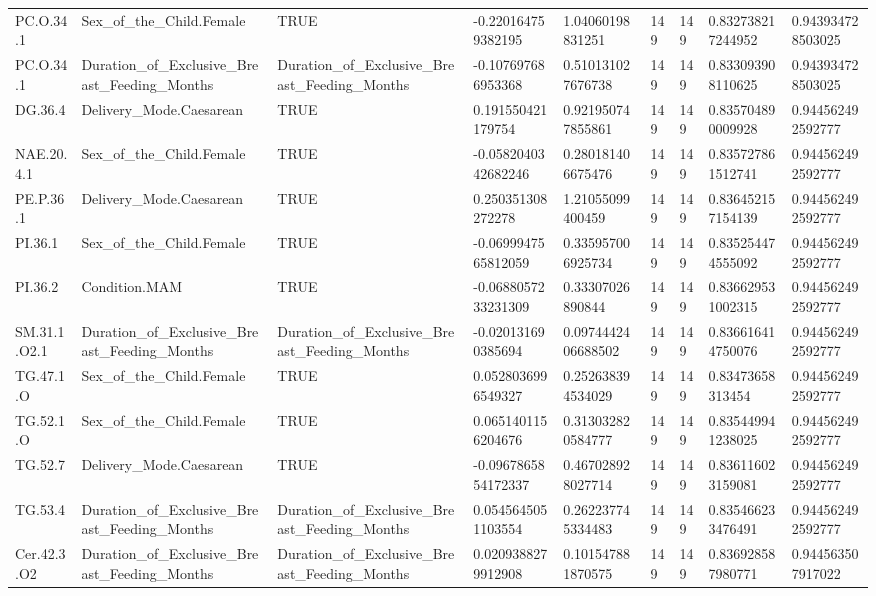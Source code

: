 \begin{longtable}{lllllllll}
PC.O.34.1 & Sex\_of\_the\_Child.Female & TRUE & -0.220164759382195 & 1.04060198831251 & 149 & 149 & 0.832738217244952 & 0.943934728503025 \\
PC.O.34.1 & Duration\_of\_Exclusive\_Breast\_Feeding\_Months & Duration\_of\_Exclusive\_Breast\_Feeding\_Months & -0.107697686953368 & 0.510131027676738 & 149 & 149 & 0.833093908110625 & 0.943934728503025 \\
DG.36.4 & Delivery\_Mode.Caesarean & TRUE & 0.191550421179754 & 0.921950747855861 & 149 & 149 & 0.835704890009928 & 0.944562492592777 \\
NAE.20.4.1 & Sex\_of\_the\_Child.Female & TRUE & -0.0582040342682246 & 0.280181406675476 & 149 & 149 & 0.835727861512741 & 0.944562492592777 \\
PE.P.36.1 & Delivery\_Mode.Caesarean & TRUE & 0.250351308272278 & 1.21055099400459 & 149 & 149 & 0.836452157154139 & 0.944562492592777 \\
PI.36.1 & Sex\_of\_the\_Child.Female & TRUE & -0.0699947565812059 & 0.335957006925734 & 149 & 149 & 0.835254474555092 & 0.944562492592777 \\
PI.36.2 & Condition.MAM & TRUE & -0.0688057233231309 & 0.33307026890844 & 149 & 149 & 0.836629531002315 & 0.944562492592777 \\
SM.31.1.O2.1 & Duration\_of\_Exclusive\_Breast\_Feeding\_Months & Duration\_of\_Exclusive\_Breast\_Feeding\_Months & -0.020131690385694 & 0.0974442406688502 & 149 & 149 & 0.836616414750076 & 0.944562492592777 \\
TG.47.1.O & Sex\_of\_the\_Child.Female & TRUE & 0.0528036996549327 & 0.252638394534029 & 149 & 149 & 0.83473658313454 & 0.944562492592777 \\
TG.52.1.O & Sex\_of\_the\_Child.Female & TRUE & 0.0651401156204676 & 0.313032820584777 & 149 & 149 & 0.835449941238025 & 0.944562492592777 \\
TG.52.7 & Delivery\_Mode.Caesarean & TRUE & -0.0967865854172337 & 0.467028928027714 & 149 & 149 & 0.836116023159081 & 0.944562492592777 \\
TG.53.4 & Duration\_of\_Exclusive\_Breast\_Feeding\_Months & Duration\_of\_Exclusive\_Breast\_Feeding\_Months & 0.0545645051103554 & 0.262237745334483 & 149 & 149 & 0.835466233476491 & 0.944562492592777 \\
Cer.42.3.O2 & Duration\_of\_Exclusive\_Breast\_Feeding\_Months & Duration\_of\_Exclusive\_Breast\_Feeding\_Months & 0.0209388279912908 & 0.101547881870575 & 149 & 149 & 0.836928587980771 & 0.944563507917022 \\

\end{longtable}
